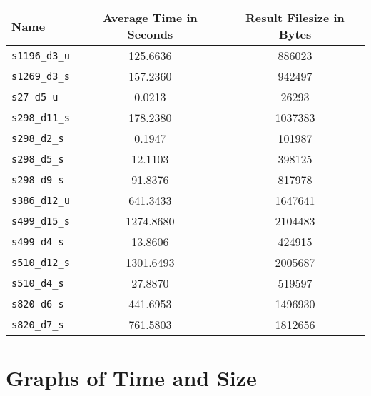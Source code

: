 \begin{center}
\begin{tabular}{| l | S[table-format=3.2] | S[table-format=3.2] |}
\hline
\textbf{Name} & \textbf{Average Time in Seconds} & \textbf{Result Filesize in Bytes} \\ \hline
\texttt{s1196\_d3\_u} & 125.6636 & 886023 \\
\texttt{s1269\_d3\_s} & 157.2360 & 942497 \\
\texttt{s27\_d5\_u} & 0.0213 & 26293 \\
\texttt{s298\_d11\_s} & 178.2380 & 1037383 \\
\texttt{s298\_d2\_s} & 0.1947 & 101987 \\
\texttt{s298\_d5\_s} & 12.1103 & 398125 \\
\texttt{s298\_d9\_s} & 91.8376 & 817978 \\
\texttt{s386\_d12\_u} & 641.3433 & 1647641 \\
\texttt{s499\_d15\_s} & 1274.8680 & 2104483 \\
\texttt{s499\_d4\_s} & 13.8606 & 424915 \\
\texttt{s510\_d12\_s} & 1301.6493 & 2005687 \\
\texttt{s510\_d4\_s} & 27.8870 & 519597 \\
\texttt{s820\_d6\_s} & 441.6953 & 1496930 \\
\texttt{s820\_d7\_s} & 761.5803 & 1812656 \\
\hline
\end{tabular}
\end{center}

\section{Graphs of Time and Size}

\begin{center}

\end{center}

\begin{center}

\end{center}

\begin{center}

\end{center}

\begin{center}

\end{center}
